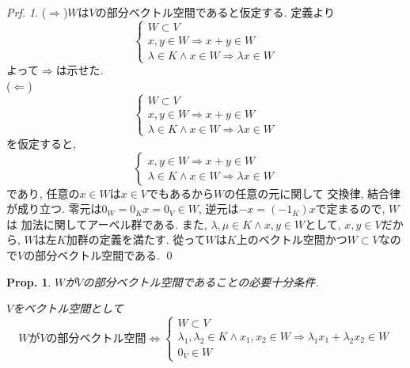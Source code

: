 \documentclass[a4paper,10pt,report]{amsart}
\theoremstyle{plain}
\newtheorem{prop}{Prop.}[section]
\theoremstyle{definition}
\theoremstyle{remark}
\newtheorem{prf}{Prf.}
\begin{document}
\begin{prf}
    (\(\Rightarrow \))\(W\)は\(V\)の部分ベクトル空間であると仮定する. 
    定義より
    \begin{equation*}
        \begin{cases}
            W\subset V\\
            x, y\in W\Rightarrow x+y\in W\\
            \lambda\in K\wedge x\in W\Rightarrow \lambda x\in W
        \end{cases}
    \end{equation*}
    よって\(\Rightarrow{}\)は示せた. \\
    (\(\Leftarrow{}\))
    \begin{equation*}
        \begin{cases}
            W\subset V\\
            x, y\in W\Rightarrow x+y\in W\\
            \lambda\in K\wedge x\in W\Rightarrow \lambda x\in W
        \end{cases}
    \end{equation*}
    を仮定すると, 
    \begin{equation*}
        \begin{cases}
            x, y\in W\Rightarrow x+y\in W\\
            \lambda\in K\wedge x\in W\Rightarrow \lambda x\in W
        \end{cases}
    \end{equation*}
    であり, 任意の\(x\in W\)は\(x\in V\)でもあるから\(W\)の任意の元に関して
    交換律, 結合律が成り立つ. 零元は\(0_{W}=0_{K}x=0_{V}\in W\), 逆元は\(-x=(-1_{K})x\)で定まるので, \(W\)は
    加法に関してアーベル群である.  また, \(\lambda, \mu\in K\wedge{}x,y\in W\)として, 
    \(x,y\in V\)だから, \(W\)は左\(K\)加群の定義を満たす. 
    從って\(W\)は\(K\)上のベクトル空間かつ\(W\subset V\)なので\(V\)の部分ベクトル空間である. 
    \qed{}
\end{prf}
\begin{leftbar}
    \begin{prop}\label{prop::NSC_for_linear_subspace_2}\(W\)が\(V\)の部分ベクトル空間であることの必要十分条件. \par
        \(V\)をベクトル空間として
        \begin{equation*}
            \mbox{\(W\)が\(V\)の部分ベクトル空間}\Leftrightarrow
            \begin{cases}
                W\subset V\\
                \lambda_{1}, \lambda_{2}\in K\wedge x_{1}, x_{2}\in W\Rightarrow \lambda_{1}x_{1}+\lambda_{2}x_{2}\in W\\
                0_{V}\in W
            \end{cases}
        \end{equation*}
    \end{prop}
\end{leftbar}
\end{document}
